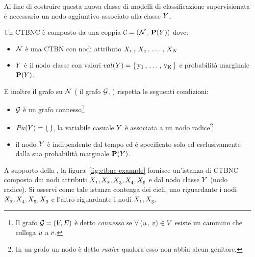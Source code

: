 Al fine di costruire questa nuova classe di modelli di classificazione supervisionata è necessario un nodo aggiuntivo associato alla classe $\mathnormal{Y}$.
\begin{definizione}\label{defn:ctbnc}
Un \acf{CTBNC} è composto da una coppia $\mathcal{C}=(\mathcal{N}\,,\,\mathbf{P}(\mathnormal{Y}))$ dove:
\begin{itemize}
    \item $\mathcal{N}$ è una \acs{CTBN} con nodi attributo $\mathnormal{X_1}\,,\,\mathnormal{X_2}\,,\,\dotsc\,,\,\mathnormal{X_N}$
    \item $\mathnormal{Y}$ è il nodo classe con valori $val(\mathnormal{Y})=\{\,\mathrm{y_1}\,,\,\dotsc\,,\,\mathrm{y_K}\,\}$ e probabilità marginale $\mathbf{P}(\mathnormal{Y})$.
\end{itemize}
E inoltre il grafo su $\mathcal{N}$ (\ie{} il grafo $\mathcal{G}$, ) rispetta le seguenti condizioni:
\begin{itemize}
    \item $\mathcal{G}$ è un grafo connesso\footnote{Il grafo $\mathcal{G} = (\mathnormal{V}, \mathnormal{E})$ è detto \emph{connesso} se $\forall \: (\mathnormal{u}\,,\,\mathnormal{v}) \in \mathnormal{V}$ esiste un cammino che collega $\mathnormal{u}$ a $\mathnormal{v}$.}
    \item $Pa(\mathnormal{Y})=\{\,\}$, \ie{} la variabile casuale $\mathnormal{Y}$ è associata a un nodo radice\footnote{In un grafo un nodo è detto \emph{radice} qualora esso non abbia alcun genitore.}
    \item il nodo $\mathnormal{Y}$ è indipendente dal tempo ed è specificato solo ed esclusivamente dalla sua probabilità marginale $\mathbf{P}(\mathnormal{Y})$.
\end{itemize}
\end{definizione}
A supporto della , la figura~\vref{fig:ctbnc-example} fornisce un'istanza di \acs{CTBNC} composta dai nodi attributi $\mathnormal{X_1},\mathnormal{X_2},\mathnormal{X_3},\mathnormal{X_4},\mathnormal{X_5}$ e dal nodo classe $\mathnormal{Y}$ (nodo radice). Si osservi come tale istanza contenga dei cicli, uno riguardante i nodi $\mathnormal{X_2},\mathnormal{X_4},\mathnormal{X_5},\mathnormal{X_3}$ e l'altro riguardante i nodi $\mathnormal{X_1},\mathnormal{X_3}$.


